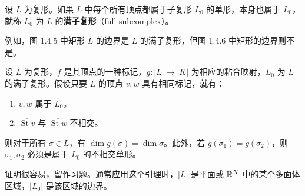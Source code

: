 设 $L$ 为复形。如果 $L$ 中每个所有顶点都属于子复形 $L_0$ 的单形，本身也属于 $L_0$，就称 $L_0$ 为 $L$ 的\textbf{满子复形}（full subcomplex）。

例如，图 1.4.5 中矩形 $L$ 的边界是 $L$ 的满子复形，但图 1.4.6 中矩形的边界则不是。

设 $L$ 为复形，$f$ 是其顶点的一种标记，$g:|L|\to|K|$ 为相应的粘合映射，$L_0$ 为 $L$ 的满子复形。假设只要 $L$ 的顶点 $v,w$ 具有相同标记，就有：
\begin{enumerate}[label=(\arabic*)]
\item $v,w$ 属于 $L_0$。
\item $\overline{\operatorname{St}v}$ 与 $\overline{\operatorname{St}w}$ 不相交。
\end{enumerate}
则对于所有 $\sigma\in L$，有 $\dim g(\sigma)=\dim\sigma$。此外，若 $g(\sigma_1)=g(\sigma_2)$，则 $\sigma_1,\sigma_2$ 必须是属于 $L_0$ 的不相交单形。

证明很容易，留作习题。通常应用这个引理时，$|L|$ 是平面或 $\mathbb{R}^N$ 中的某个多面体区域，$|L_0|$ 是该区域的边界。

